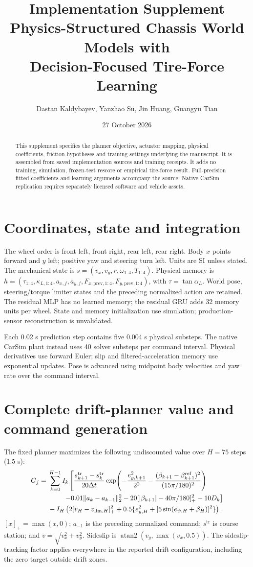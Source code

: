 \documentclass[11pt]{article}
\title{Implementation Supplement\\\large Physics-Structured Chassis World Models with\\Decision-Focused Tire-Force Learning}
\author{Dastan Kaldybayev, Yanzhao Su, Jin Huang, Guangyu Tian}
\date{27 October 2026}
\begin{document}
\maketitle
\begin{abstract}
This supplement specifies the planner objective, actuator mapping, physical coefficients, friction hypotheses and training settings underlying the manuscript. It is assembled from saved implementation sources and training receipts. It adds no training, simulation, frozen-test rescore or empirical tire-force result. Full-precision fitted coefficients and learning arguments accompany the source. Native CarSim replication requires separately licensed software and vehicle assets.
\end{abstract}

\section{Coordinates, state and integration}
The wheel order is front left, front right, rear left, rear right. Body $x$ points forward and $y$ left; positive yaw and steering turn left. Units are SI unless stated. The mechanical state is $s=(v_x,v_y,r,\omega_{1:4},T_{1:4})$. Physical memory is $h=(\tau_{1:4},\kappa_{L,1:4},a_{x,f},a_{y,f},F_{x,\mathrm{prev},1:4},F_{y,\mathrm{prev},1:4})$, with $\tau=\tan\alpha_L$. World pose, steering/torque limiter states and the preceding normalized action are retained. The residual MLP has no learned memory; the residual GRU adds 32 memory units per wheel. State and memory initialization use simulation; production-sensor reconstruction is unvalidated.

Each 0.02 s prediction step contains five 0.004 s physical substeps. The native CarSim plant instead uses 40 solver substeps per command interval. Physical derivatives use forward Euler; slip and filtered-acceleration memory use exponential updates. Pose is advanced using midpoint body velocities and yaw rate over the command interval.

\section{Complete drift-planner value and command generation}
The fixed planner maximizes the following undiscounted value over $H=75$ steps (1.5 s):
\begin{align}
G_j={}&\sum_{k=0}^{H-1}I_k\left[\frac{s_{k+1}^{\mathrm{tr}}-s_k^{\mathrm{tr}}}{20\Delta t}
\exp\!\left(-\frac{e_{y,k+1}^2}{2^2}-\frac{(\beta_{k+1}-\beta^{\mathrm{ref}}_{k+1})^2}{(15\pi/180)^2}\right)\right.\nonumber\\
&\left.\hspace{8mm}-0.01\|a_k-a_{k-1}\|_2^2-20[|\beta_{k+1}|-40\pi/180]_+^2-10D_k\right]\nonumber\\
&-I_H\left(2[v_H-v_{\lim,H}]_+^2+0.5\{e_{y,H}^2+[5\sin(e_{\psi,H}+\beta_H)]^2\}\right).
\label{eq:value}
\end{align}
$[x]_+=\max(x,0)$; $a_{-1}$ is the preceding normalized command; $s^{\mathrm{tr}}$ is course station; and $v=\sqrt{v_x^2+v_y^2}$. Sideslip is $\operatorname{atan2}(v_y,\max(v_x,0.5))$. The sideslip-tracking factor applies everywhere in the reported drift configuration, including the zero target outside drift zones.
\end{document}
